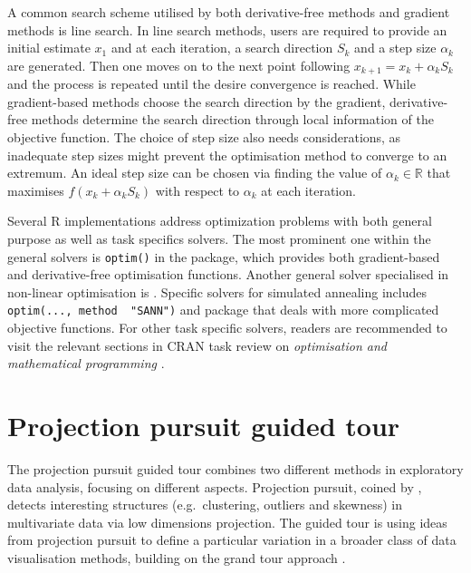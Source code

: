 A common search scheme utilised by both derivative-free methods and
gradient methods is line search. In line search methods, users are
required to provide an initial estimate \(x_{1}\) and at each iteration,
a search direction \(S_k\) and a step size \(\alpha_k\) are generated.
Then one moves on to the next point following
\(x_{k+1} = x_k + \alpha_kS_k\) and the process is repeated until the
desire convergence is reached. While gradient-based methods choose the
search direction by the gradient, derivative-free methods determine the
search direction through local information of the objective function.
The choice of step size also needs considerations, as inadequate step
sizes might prevent the optimisation method to converge to an extremum.
An ideal step size can be chosen via finding the value of
\(\alpha_k \in \mathbb{R}\) that maximises \(f(x_k + \alpha_kS_k)\) with
respect to \(\alpha_k\) at each iteration.

Several R implementations address optimization problems with both
general purpose as well as task specifics solvers. The most prominent
one within the general solvers is \texttt{optim()} in the
 \citep{stats} package, which provides both
gradient-based and derivative-free optimisation functions. Another
general solver specialised in non-linear optimisation is
 \citep{nloptr}. Specific solvers for simulated
annealing includes \texttt{optim(...,\ method\ \ "SANN")} and package
 \citep{gensa} that deals with more complicated objective
functions. For other task specific solvers, readers are recommended to
visit the relevant sections in CRAN task review on \emph{optimisation
and mathematical programming} \citep{crantaskreviewoptim}.

\hypertarget{tour}{%
\section{Projection pursuit guided tour}\label{tour}}

The projection pursuit guided tour combines two different methods in
exploratory data analysis, focusing on different aspects. Projection
pursuit, coined by \citet{friedman1974projection}, detects interesting
structures (e.g.~clustering, outliers and skewness) in multivariate data
via low dimensions projection. The guided tour is using ideas from
projection pursuit to define a particular variation in a broader class
of data visualisation methods, building on the grand tour approach
\citep{As85}.

